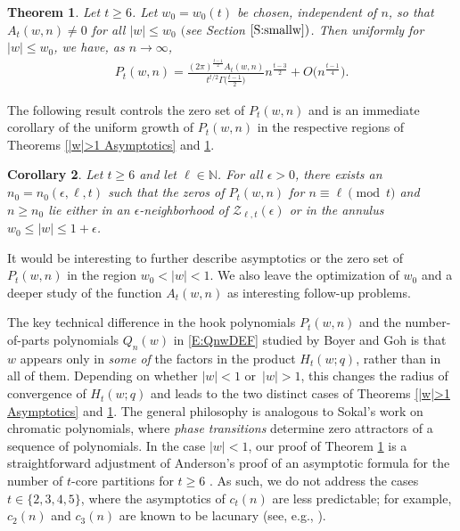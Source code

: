 \documentclass[pdftex]{sigma}
\numberwithin{equation}{section}
\newtheorem{Theorem}{Theorem}[section]
\newtheorem{Corollary}[Theorem]{Corollary}
\begin{document}
\begin{Theorem} \label{|w|<1 Asymptotics}
 Let $t \geq 6$. Let $w_0=w_0(t)$ be chosen, independent of $n$, so that $A_t(w,n) \neq 0$ for all $|w|\leq w_0$ $($see Section $\ref{S:smallw})$. Then uniformly for $|w|\leq w_0$, we have, as $n \to \infty$,
 \begin{align*}
 P_t(w,n)= \frac{(2\pi)^{\frac{t-1}{2}}A_t(w,n)}{t^{t/2}\Gamma\bigl(\frac{t-1}{2}\bigr)}n^{\frac{t-3}{2}} + O\big(n^{\frac{t-1}{4}}\big).
 \end{align*}
\end{Theorem}

 The following result controls the zero set of $P_t(w,n)$ and is an immediate corollary of the uniform growth of $P_t(w,n)$ in the respective regions of Theorems \ref{|w|>1 Asymptotics} and \ref{|w|<1 Asymptotics}.

\begin{Corollary}
 Let $t \geq 6$ and let $\ell \in \mathbb{N}$. For all $\epsilon>0$, there exists an $n_0=n_0(\epsilon,\ell,t)$ such that the zeros of $P_t(w,n)$ for $n \equiv \ell \pmod{t}$ and $n \geq n_0$ lie either in an $\epsilon$-neighborhood of $\mathcal{Z}_{\ell,t}(\epsilon)$ or in the annulus $w_0\leq |w|\leq 1+\epsilon$.
\end{Corollary}

\begin{Remark}
 It would be interesting to further describe asymptotics or the zero set of $P_t(w,n)$ in the region $w_0<|w|<1$. We also leave the optimization of $w_0$ and a deeper study of the function $A_t(w,n)$ as interesting follow-up problems.
\end{Remark}


The key technical difference in the hook polynomials $P_t(w,n)$ and the number-of-parts polynomials $Q_n(w)$ in \eqref{E:QnwDEF} studied by Boyer and Goh \cite{BG1,BG2} is that $w$ appears only in {\it some of} the factors in the product $H_t(w;q)$, rather than in all of them. Depending on whether $|w|<1$ or~${|w|>1}$, this changes the radius of convergence of $H_t(w;q)$ and leads to the two distinct cases of Theorems \ref{|w|>1 Asymptotics} and \ref{|w|<1 Asymptotics}. The general philosophy is analogous to Sokal's work on chromatic polynomials, where {\it phase transitions} determine zero attractors of a sequence of polynomials. In the case $|w|<1$, our proof of Theorem \ref{|w|<1 Asymptotics} is a straightforward adjustment of Anderson's proof of an asymptotic formula for the number of $t$-core partitions for $t \geq 6$ \cite{Anderson}. As such, we do not address the cases $t\in \{2,3,4,5\}$, where the asymptotics of $c_t(n)$ are less predictable; for example, $c_2(n)$ and $c_3(n)$ are known to be lacunary (see, e.g., \cite[pp.~333--334]{GranvilleOno}).
\end{document}

